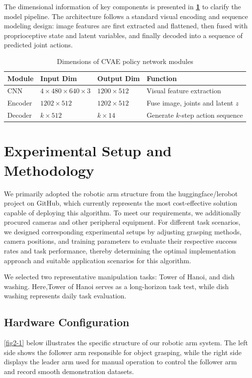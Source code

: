 \documentclass[runningheads]{llncs}
\begin{document}
The dimensional information of key components is presented in \textbf{\cref{tab:dim_summary}} to clarify the model pipeline. The architecture follows a standard visual encoding and sequence modeling design: image features are first extracted and flattened, then fused with proprioceptive state and latent variables, and finally decoded into a sequence of predicted joint actions.


\begin{table}[htbp]
	\centering
	\caption{Dimensions of CVAE policy network modules}
	\label{tab:dim_summary}
	\begin{tabularx}{\textwidth}{@{}>{\raggedright\arraybackslash}X >{\raggedright\arraybackslash}X >{\raggedright\arraybackslash}X >{\raggedright\arraybackslash}X@{}}
		\toprule
		\textbf{Module} & \textbf{Input Dim} & \textbf{Output Dim} & \textbf{Function} \\
		\midrule
		CNN & $4 \times 480 \times 640 \times 3$ & $1200 \times 512$ & Visual feature extraction \\
		Encoder & $1202 \times 512$ & $1202 \times 512$ & Fuse image, joints and latent $z$ \\
		Decoder & $k \times 512$ & $k \times 14$ & Generate $k$-step action sequence \\
		\bottomrule
	\end{tabularx}
\end{table}

\section{Experimental Setup and Methodology}
We primarily adopted the robotic arm structure from the huggingface/lerobot project on GitHub, which currently represents the most cost-effective solution capable of deploying this algorithm. To meet our requirements, we additionally procured cameras and other peripheral equipment. For different task scenarios, we designed corresponding experimental setups by adjusting grasping methods, camera positions, and training parameters to evaluate their respective success rates and task performance, thereby determining the optimal implementation approach and suitable application scenarios for this algorithm.

We selected two representative manipulation tasks: Tower of Hanoi, and dish washing. Here,Tower of Hanoi serves as a long-horizon task test, while dish washing represents daily task evaluation.

\subsection{Hardware Configuration}
\cref{fig2-1} below illustrates the specific structure of our robotic arm system. The left side shows the follower arm responsible for object grasping, while the right side displays the leader arm used for manual operation to control the follower arm and record smooth demonstration datasets.
\end{document}

